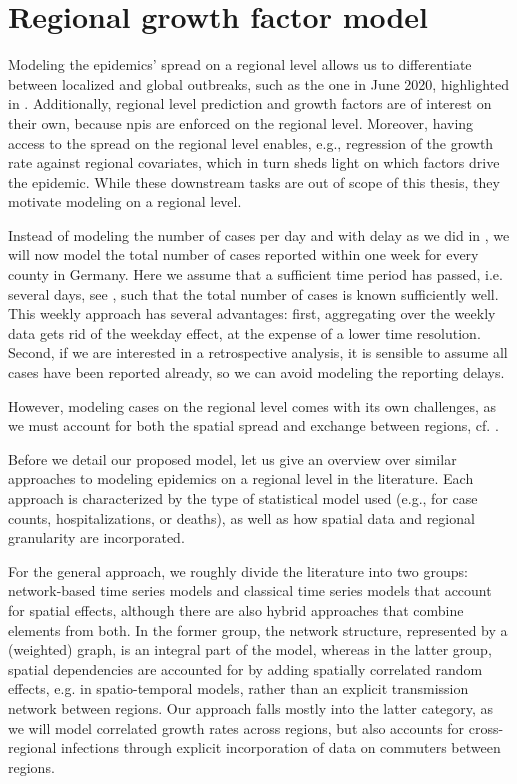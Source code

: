 \section{Regional growth factor model}%
\label{sec:regional_growth_factor_model}

Modeling the epidemics' spread on a regional level allows us to differentiate between localized and global outbreaks, such as the one in June 2020, highlighted in . Additionally, regional level prediction and growth factors are of interest on their own, because \glspl{npi} are enforced on the regional level. Moreover, having access to the spread on the regional level enables, e.g., regression of the growth rate against regional covariates, which in turn sheds light on which factors drive the epidemic. While these downstream tasks are out of scope of this thesis, they motivate modeling on a regional level.

Instead of modeling the number of cases per day and with delay as we did in , we will now model the total number of cases reported within one week for every county in Germany. Here we assume that a sufficient time period has passed, i.e. several days, see , such that the total number of cases is known sufficiently well. This weekly approach has several advantages: first, aggregating over the weekly data gets rid of the weekday effect, at the expense of a lower time resolution. Second, if we are interested in a retrospective analysis, it is sensible to assume all cases have been reported already, so we can avoid modeling the reporting delays. 

However, modeling cases on the regional level comes with its own challenges, as we must account for both the spatial spread and exchange between regions, cf. . 

Before we detail our proposed model, let us give an overview over similar approaches to modeling epidemics on a regional level in the literature. 
Each approach is characterized by the type of statistical model used (e.g., for case counts, hospitalizations, or deaths), as well as how spatial data and regional granularity are incorporated.

For the general approach, we roughly divide the literature into two groups: network-based time series models and classical time series models that account for spatial effects, although there are also hybrid approaches that combine elements from both. 
In the former group, the network structure, represented by a (weighted) graph, is an integral part of the model, whereas in the latter group, spatial dependencies are accounted for by adding spatially correlated random effects, e.g. in spatio-temporal models, rather than an explicit transmission network between regions. 
Our approach falls mostly into the latter category, as we will model correlated growth rates across regions, but also accounts for cross-regional infections through explicit incorporation of data on commuters between regions.

